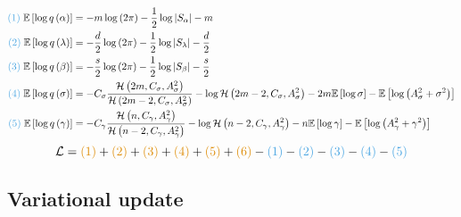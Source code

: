 \documentclass[11pt]{article}
\begin{document}
\begin{align*}
  \textcolor{myblue}{(1)}\;\mathbb{E}\left[\log q\left(\alpha\right)\right] &= -m\log \left(2\pi \right) -\frac{1}{2}\log \left|S_{\alpha}\right| -m\\
  \textcolor{myblue}{(2)}\;\mathbb{E}\left[\log q\left(\lambda\right)\right] &= -\frac{d}{2}\log \left(2\pi \right) -\frac{1}{2}\log \left|S_{\lambda}\right| -\frac{d}{2}\\
  \textcolor{myblue}{(3)}\;\mathbb{E}\left[\log q\left(\beta\right)\right] &= -\frac{s}{2}\log \left(2\pi \right) -\frac{1}{2}\log \left|S_{\beta}\right| -\frac{s}{2}\\
  \textcolor{myblue}{(4)}\;\mathbb{E}\left[\log q\left(\sigma\right)\right] &= -C_{\sigma}\frac{\mathcal{H}\left(2m, C_{\sigma}, A_{\sigma}^{2}\right)}{\mathcal{H}\left(2m-2, C_{\sigma}, A_{\sigma}^{2}\right)} -\log \mathcal{H}\left(2m-2, C_{\sigma}, A_{\sigma}^{2}\right) -2m \mathbb{E}\left[\log \sigma\right] -\mathbb{E}\left[\log \left(A_{\sigma}^{2}+\sigma^{2}\right)\right]\\
  \textcolor{myblue}{(5)}\;\mathbb{E}\left[\log q\left(\gamma\right)\right] &= -C_{\gamma}\frac{\mathcal{H}\left(n, C_{\gamma}, A_{\gamma}^{2}\right)}{\mathcal{H}\left(n-2, C_{\gamma}, A_{\gamma}^{2}\right)} -\log \mathcal{H}\left(n-2, C_{\gamma}, A_{\gamma}^{2}\right) -n \mathbb{E}\left[\log \gamma\right] -\mathbb{E}\left[\log \left(A_{\gamma}^{2}+\gamma^{2}\right)\right]
\end{align*}
$$
  \mathcal{L} = \textcolor{myorange}{(1)} + \textcolor{myorange}{(2)} + \textcolor{myorange}{(3)} + \textcolor{myorange}{(4)} + \textcolor{myorange}{(5)} + \textcolor{myorange}{(6)} - \textcolor{myblue}{(1)} - \textcolor{myblue}{(2)} - \textcolor{myblue}{(3)} - \textcolor{myblue}{(4)} - \textcolor{myblue}{(5)}
$$
\subsection{Variational update}
\end{document}
